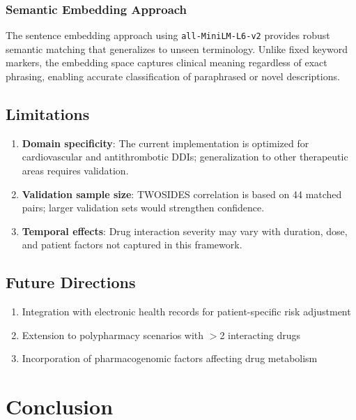 \documentclass[11pt,a4paper]{article}
\begin{document}
\subsubsection{Semantic Embedding Approach}

The sentence embedding approach using \texttt{all-MiniLM-L6-v2} provides robust semantic matching that generalizes to unseen terminology. Unlike fixed keyword markers, the embedding space captures clinical meaning regardless of exact phrasing, enabling accurate classification of paraphrased or novel descriptions.

\subsection{Limitations}

\begin{enumerate}
    \item \textbf{Domain specificity}: The current implementation is optimized for cardiovascular and antithrombotic DDIs; generalization to other therapeutic areas requires validation.
    \item \textbf{Validation sample size}: TWOSIDES correlation is based on 44 matched pairs; larger validation sets would strengthen confidence.
    \item \textbf{Temporal effects}: Drug interaction severity may vary with duration, dose, and patient factors not captured in this framework.
\end{enumerate}

\subsection{Future Directions}

\begin{enumerate}
    \item Integration with electronic health records for patient-specific risk adjustment
    \item Extension to polypharmacy scenarios with $>$2 interacting drugs
    \item Incorporation of pharmacogenomic factors affecting drug metabolism
\end{enumerate}

\section{Conclusion}
\end{document}
